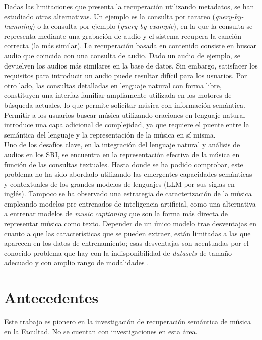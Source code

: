 Dadas las limitaciones que presenta la recuperación utilizando metadatos, se han estudiado otras alternativas. Un ejemplo es la consulta por tarareo (\textit{query-by-humming}) o la consulta por ejemplo (\textit{query-by-example}), en la que la consulta se representa mediante una grabación de audio y el sistema recupera la canción correcta (la más similar). La recuperación basada en contenido consiste en buscar audio que coincida con una consulta de audio. Dado un audio de ejemplo, se devuelven los audios más similares en la base de datos. Sin embargo, satisfacer los requisitos para introducir un audio puede resultar difícil para los usuarios. Por otro lado, las consultas detalladas en lenguaje natural con forma libre, constituyen una interfaz familiar ampliamente utilizada en los motores de búsqueda actuales, lo que permite solicitar música con información semántica.\\
Permitir a los usuarios buscar música utilizando oraciones en lenguaje natural introduce una capa adicional de complejidad, ya que requiere el puente entre la semántica del lenguaje y la representación de la música en sí misma.\\
Uno de los desafíos clave, en la integración del lenguaje natural y análisis de audios en los SRI, se encuentra en la representación efectiva de la música en función de las consultas textuales. Hasta donde se ha podido comprobar, este problema no ha sido abordado utilizando las emergentes capacidades semánticas y contextuales de los grandes modelos de lenguajes (LLM por sus siglas en inglés). Tampoco se ha observado una estrategia de caracterización de la música empleando modelos pre-entrenados de inteligencia artificial, como una alternativa a entrenar modelos de \textit{music captioning} que son la forma más directa de representar música como texto. Depender de un único modelo trae desventajas en cuanto a que las características que se pueden extraer, están limitadas a las que aparecen en los datos de entrenamiento; esas desventajas son acentuadas por el conocido problema que hay con la indisponibilidad de \textit{datasets} de tamaño adecuado y con amplio rango de modalidades \cite{Simonetta2019MultimodalMI}. \\ 
\section{Antecedentes}
Este trabajo es pionero en la investigación de recuperación semántica de música en la Facultad. No se cuentan con investigaciones en esta área. 
